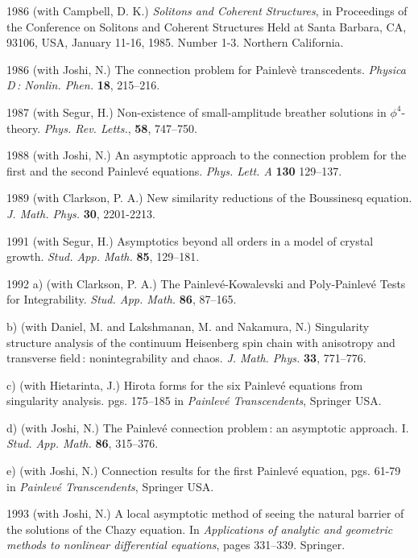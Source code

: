 \documentclass[11pt]{article}
\begin{document}
\item[1986] (with Campbell, D. K.) \textit{Solitons and Coherent Structures}, in Proceedings of the Conference on Solitons 
and Coherent Structures Held at Santa Barbara, CA, 93106, USA, January 11-16, 1985. Number 1-3. Northern California.

\item[1986]	(with Joshi, N.) The connection problem for Painlev\`e transcedents. \textit{Physica D\,: Nonlin. Phen.} \textbf{18}, 215--216. 

\item[1987] (with Segur, H.) Non-existence of small-amplitude breather solutions in $\phi^4$-theory.  \textit{Phys. Rev. Letts.}, 
\textbf{58}, 747--750.

\item[1988] (with Joshi, N.) An asymptotic approach to the connection problem for the first and the second Painlev\'e equations. 
\textit{Phys. Lett. A} \textbf{130} 129--137.

\item[1989] (with Clarkson, P. A.) New similarity reductions of the Boussinesq equation. \textit{J. Math. Phys.} \textbf{30}, 2201-2213.

\item[1991] (with Segur, H.) Asymptotics beyond all orders in a model of crystal growth. \textit{Stud. App. Math.} \textbf{85}, 129--181. 

\item[1992] a) (with Clarkson, P. A.) The Painlev\'e-Kowalevski and Poly‐Painlev\'e Tests for Integrability. 
\textit{Stud. App. Math.} \textbf{86},  87--165.

b) (with Daniel, M. and  Lakshmanan, M. and Nakamura, N.) Singularity structure analysis of the continuum 
Heisenberg spin chain with anisotropy and transverse field\,: nonintegrability and chaos. \textit{J. Math. Phys.}  
\textbf{33}, 771--776.

c) (with Hietarinta, J.) Hirota forms for the six Painlev\'e equations from singularity analysis.  
pgs. 175--185 in \textit{Painlev\'e Transcendents}, Springer USA.

d) (with Joshi, N.)  The Painlev\'e connection problem\,: an asymptotic approach. I. \textit{Stud. 
App. Math.} \textbf{86}, 315--376.

e) (with Joshi, N.) Connection results for the first Painlev\'e equation, pgs. 61-79 in \textit{Painlev\'e Transcendents}, Springer USA.

\item[1993] (with Joshi, N.) A local asymptotic method of seeing the natural barrier of the solutions of the Chazy equation. 
In \textit{Applications of analytic and geometric methods to nonlinear differential equations}, pages 331--339. Springer.
\end{document}
